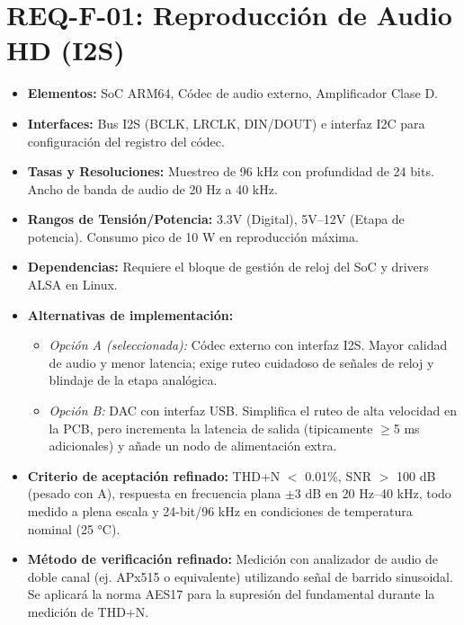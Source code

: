\documentclass[%
	paper=a4,
	twoside=false,
	parskip=half,
	chapterprefix=false,
	10pt,
	headings=normal,
	bibliography=totoc,
	listof=totoc,
	titlepage=on,
	captions=tableabove,
	draft=false,
]{scrbook}%
\begin{document}
\section{REQ-F-01: Reproducción de Audio HD (I2S)}
\begin{itemize}
    \item \textbf{Elementos:} SoC ARM64, Códec de audio externo, Amplificador Clase D.
    \item \textbf{Interfaces:} Bus I2S (BCLK, LRCLK, DIN/DOUT) e interfaz I2C para configuración del registro del códec.
    \item \textbf{Tasas y Resoluciones:} Muestreo de 96 kHz con profundidad de 24 bits. Ancho de banda de audio de 20 Hz a 40 kHz.
    \item \textbf{Rangos de Tensión/Potencia:} 3.3V (Digital), 5V–12V (Etapa de potencia). Consumo pico de 10 W en reproducción máxima.
    \item \textbf{Dependencias:} Requiere el bloque de gestión de reloj del SoC y drivers ALSA en Linux.
    \item \textbf{Alternativas de implementación:}
        \begin{itemize}
            \item \textit{Opción A (seleccionada):} Códec externo con interfaz I2S. Mayor calidad de audio y menor latencia; exige ruteo cuidadoso de señales de reloj y blindaje de la etapa analógica.
            \item \textit{Opción B:} DAC con interfaz USB. Simplifica el ruteo de alta velocidad en la PCB, pero incrementa la latencia de salida (tipicamente $\geq$5 ms adicionales) y añade un nodo de alimentación extra.
        \end{itemize}
    \item \textbf{Criterio de aceptación refinado:} THD+N $<$ 0.01\%, SNR $>$ 100 dB (pesado con A), respuesta en frecuencia plana $\pm$3 dB en 20 Hz–40 kHz, todo medido a plena escala y 24-bit/96 kHz en condiciones de temperatura nominal (25 °C).
    \item \textbf{Método de verificación refinado:} Medición con analizador de audio de doble canal (ej. APx515 o equivalente) utilizando señal de barrido sinusoidal. Se aplicará la norma AES17 para la supresión del fundamental durante la medición de THD+N.
\end{itemize}

\end{document}
